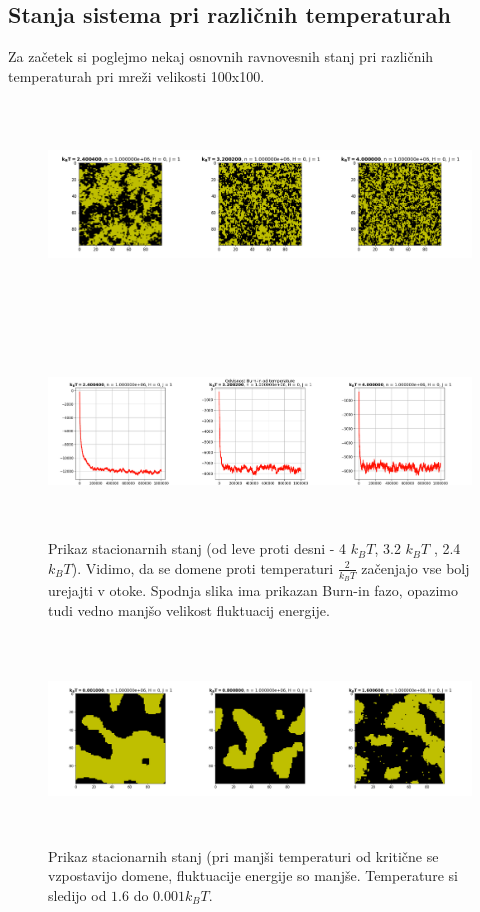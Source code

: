\documentclass[11pt, a4paper]{article}
\begin{document}
\subsection{Stanja sistema pri različnih temperaturah}
Za začetek si poglejmo nekaj osnovnih ravnovesnih stanj pri različnih temperaturah pri mreži  velikosti 100x100.
 \begin{figure}[H]
\centering
  \includegraphics[width=17.5cm, height=5.5cm]{druga_domene2.png}

\end{figure}
 \begin{figure}[H]
\centering
  \includegraphics[width=17cm, height=5.5cm]{druga_domene2_burinin.png}
\caption{Prikaz stacionarnih stanj (od leve proti desni - 4 $k_B T$, 3.2 $k_BT$ , 2.4 $k_BT$). Vidimo, da se domene proti temperaturi $\frac{2}{k_BT}$ začenjajo vse bolj urejajti v otoke. Spodnja slika ima prikazan Burn-in fazo, opazimo tudi vedno manjšo velikost fluktuacij energije.}
\end{figure}  
 \begin{figure}[H]
\centering
\hspace{-1cm}
  \includegraphics[width=18cm, height=5.5cm]{druga_domene1.png}
\caption{Prikaz stacionarnih stanj (pri manjši temperaturi od kritične se vzpostavijo domene, fluktuacije energije so manjše. Temperature si sledijo od $1.6$ do $0.001 k_BT$. }
\end{figure}
\end{document}
